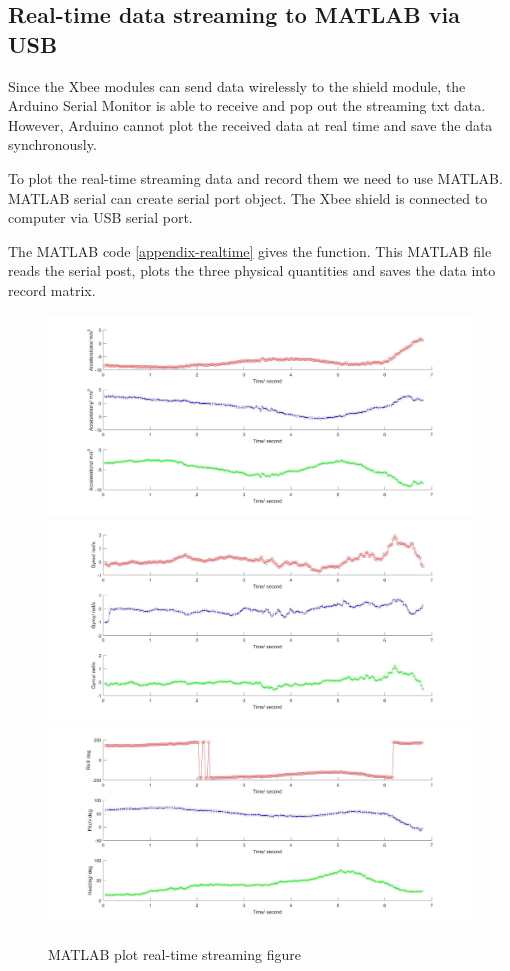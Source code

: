 \subsection{Real-time data streaming to MATLAB via USB}
Since the Xbee modules can send data wirelessly to the shield module, the Arduino Serial Monitor is able to receive and pop out the streaming txt data. However, Arduino cannot plot the received data at real time and save the data synchronously.

To plot the real-time streaming data and record them we need to use MATLAB. MATLAB serial can create serial port object. The Xbee shield is connected to computer via USB serial port.

The MATLAB code \ref{appendix-realtime} gives the function. This MATLAB file reads the serial post, plots the three physical quantities and saves the data into record matrix.       

\begin{figure}[H]
\centering
\includegraphics[width=\textwidth]{fig/DOE/acceleration}
\includegraphics[width=\textwidth]{fig/DOE/gyro}
\includegraphics[width=\textwidth]{fig/DOE/orientation}
\caption{MATLAB plot real-time streaming figure}
\end{figure}


